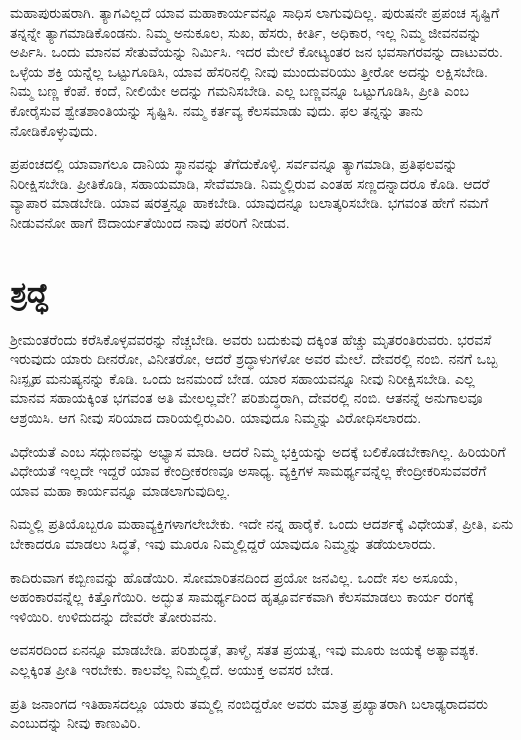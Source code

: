 ಮಹಾಪುರುಷರಾಗಿ. ತ್ಯಾಗವಿಲ್ಲದೆ ಯಾವ ಮಹಾಕಾರ್ಯವನ್ನೂ ಸಾಧಿಸ ಲಾಗುವುದಿಲ್ಲ. ಪುರುಷನೇ ಪ್ರಪಂಚ ಸೃಷ್ಟಿಗೆ ತನ್ನನ್ನೇ ತ್ಯಾಗಮಾಡಿಕೊಂಡನು. ನಿಮ್ಮ ಅನುಕೂಲ, ಸುಖ, ಹೆಸರು, ಕೀರ್ತಿ, ಅಧಿಕಾರ, ಇಲ್ಲ ನಿಮ್ಮ ಜೀವನವನ್ನು ಅರ್ಪಿಸಿ. ಒಂದು ಮಾನವ ಸೇತುವೆಯನ್ನು ನಿರ್ಮಿಸಿ. ಇದರ ಮೇಲೆ ಕೋಟ್ಯಂತರ ಜನ ಭವಸಾಗರವನ್ನು ದಾಟುವರು. ಒಳ್ಳೆಯ ಶಕ್ತಿ ಯನ್ನೆಲ್ಲ ಒಟ್ಟುಗೂಡಿಸಿ, ಯಾವ ಹೆಸರಿನಲ್ಲಿ ನೀವು ಮುಂದುವರಿಯು ತ್ತೀರೋ ಅದನ್ನು ಲಕ್ಷಿಸಬೇಡಿ. ನಿಮ್ಮ ಬಣ್ಣ ಕೆಂಪೆ. ಕಂದೆ, ನೀಲಿಯೇ ಅದನ್ನು ಗಮನಿಸಬೇಡಿ. ಎಲ್ಲ ಬಣ್ಣವನ್ನೂ ಒಟ್ಟುಗೂಡಿಸಿ, ಪ್ರೀತಿ ಎಂಬ ಕೋರೈಸುವ ಶ್ವೇತಶಾಂತಿಯನ್ನು ಸೃಷ್ಟಿಸಿ. ನಮ್ಮ ಕರ್ತವ್ಯ ಕೆಲಸಮಾಡು ವುದು. ಫಲ ತನ್ನನ್ನು ತಾನು ನೋಡಿಕೊಳ್ಳುವುದು.

ಪ್ರಪಂಚದಲ್ಲಿ ಯಾವಾಗಲೂ ದಾನಿಯ ಸ್ಥಾನವನ್ನು ತೆಗೆದುಕೊಳ್ಳಿ. ಸರ್ವವನ್ನೂ ತ್ಯಾಗಮಾಡಿ, ಪ್ರತಿಫಲವನ್ನು ನಿರೀಕ್ಷಿಸಬೇಡಿ. ಪ್ರೀತಿಕೊಡಿ, ಸಹಾಯಮಾಡಿ, ಸೇವೆಮಾಡಿ. ನಿಮ್ಮಲ್ಲಿರುವ ಎಂತಹ ಸಣ್ಣದನ್ನಾದರೂ ಕೊಡಿ. ಆದರೆ ವ್ಯಾಪಾರ ಮಾಡಬೇಡಿ. ಯಾವ ಷರತ್ತನ್ನೂ ಹಾಕಬೇಡಿ. ಯಾವುದನ್ನೂ ಬಲಾತ್ಕರಿಸಬೇಡಿ. ಭಗವಂತ ಹೇಗೆ ನಮಗೆ ನೀಡುವನೋ ಹಾಗೆ ಔದಾರ್ಯತೆಯಿಂದ ನಾವು ಪರರಿಗೆ ನೀಡುವ.


\section{ಶ್ರದ್ಧೆ}

ಶ್ರೀಮಂತರೆಂದು ಕರೆಸಿಕೊಳ್ಳವವರನ್ನು ನೆಚ್ಚಬೇಡಿ. ಅವರು ಬದುಕುವು ದಕ್ಕಿಂತ ಹೆಚ್ಚು ಮೃತರಂತಿರುವರು. ಭರವಸೆ ಇರುವುದು ಯಾರು ದೀನರೋ, ವಿನೀತರೋ, ಆದರೆ ಶ್ರದ್ಧಾಳುಗಳೋ ಅವರ ಮೇಲೆ. ದೇವರಲ್ಲಿ ನಂಬಿ. ನನಗೆ ಒಬ್ಬ ನಿಃಸ್ಪೃಹ ಮನುಷ್ಯನನ್ನು ಕೊಡಿ. ಒಂದು ಜನಮಂದೆ ಬೇಡ. ಯಾರ ಸಹಾಯವನ್ನೂ ನೀವು ನಿರೀಕ್ಷಿಸಬೇಡಿ. ಎಲ್ಲ ಮಾನವ ಸಹಾಯಕ್ಕಿಂತ ಭಗವಂತ ಅತಿ ಮೇಲಲ್ಲವೇ? ಪರಿಶುದ್ಧರಾಗಿ, ದೇವರಲ್ಲಿ ನಂಬಿ. ಆತನನ್ನೆ ಅನುಗಾಲವೂ ಆಶ್ರಯಿಸಿ. ಆಗ ನೀವು ಸರಿಯಾದ ದಾರಿಯಲ್ಲಿರುವಿರಿ. ಯಾವುದೂ ನಿಮ್ಮನ್ನು ವಿರೋಧಿಸಲಾರದು.

ವಿಧೇಯತೆ ಎಂಬ ಸದ್ಗುಣವನ್ನು ಅಭ್ಯಾಸ ಮಾಡಿ. ಆದರೆ ನಿಮ್ಮ ಭಕ್ತಿಯನ್ನು ಅದಕ್ಕೆ ಬಲಿಕೊಡಬೇಕಾಗಿಲ್ಲ. ಹಿರಿಯರಿಗೆ ವಿಧೇಯತೆ ಇಲ್ಲದೇ ಇದ್ದರೆ ಯಾವ ಕೇಂದ್ರೀಕರಣವೂ ಅಸಾಧ್ಯ. ವ್ಯಕ್ತಿಗಳ ಸಾಮರ್ಥ್ಯವನ್ನೆಲ್ಲ ಕೇಂದ್ರೀಕರಿಸುವವರೆಗೆ ಯಾವ ಮಹಾ ಕಾರ್ಯವನ್ನೂ ಮಾಡಲಾಗುವುದಿಲ್ಲ.

ನಿಮ್ಮಲ್ಲಿ ಪ್ರತಿಯೊಬ್ಬರೂ ಮಹಾವ್ಯಕ್ತಿಗಳಾಗಲೇಬೇಕು. ಇದೇ ನನ್ನ ಹಾರೈಕೆ. ಒಂದು ಆದರ್ಶಕ್ಕೆ ವಿಧೇಯತೆ, ಪ್ರೀತಿ, ಏನು ಬೇಕಾದರೂ ಮಾಡಲು ಸಿದ್ಧತೆ, ಇವು ಮೂರೂ ನಿಮ್ಮಲ್ಲಿದ್ದರೆ ಯಾವುದೂ ನಿಮ್ಮನ್ನು ತಡೆಯಲಾರದು.

ಕಾದಿರುವಾಗ ಕಬ್ಬಿಣವನ್ನು ಹೊಡೆಯಿರಿ. ಸೋಮಾರಿತನದಿಂದ ಪ್ರಯೋ ಜನವಿಲ್ಲ. ಒಂದೇ ಸಲ ಅಸೂಯೆ, ಅಹಂಕಾರವನ್ನೆಲ್ಲ ಕಿತ್ತೊಗೆಯಿರಿ. ಅದ್ಭುತ ಸಾಮರ್ಥ್ಯದಿಂದ ಹೃತ್ಪೂರ್ವಕವಾಗಿ ಕೆಲಸಮಾಡಲು ಕಾರ್ಯ ರಂಗಕ್ಕೆ ಇಳಿಯಿರಿ. ಉಳಿದುದನ್ನು ದೇವರೇ ತೋರುವನು.

ಅವಸರದಿಂದ ಏನನ್ನೂ ಮಾಡಬೇಡಿ. ಪರಿಶುದ್ಧತೆ, ತಾಳ್ಮೆ, ಸತತ ಪ್ರಯತ್ನ, ಇವು ಮೂರು ಜಯಕ್ಕೆ ಅತ್ಯಾವಶ್ಯಕ. ಎಲ್ಲಕ್ಕಿಂತ ಪ್ರೀತಿ ಇರಬೇಕು. ಕಾಲವೆಲ್ಲ ನಿಮ್ಮಲ್ಲಿದೆ. ಅಯುಕ್ತ ಅವಸರ ಬೇಡ. 

ಪ್ರತಿ ಜನಾಂಗದ ಇತಿಹಾಸದಲ್ಲೂ ಯಾರು ತಮ್ಮಲ್ಲಿ ನಂಬಿದ್ದರೋ ಅವರು ಮಾತ್ರ ಪ್ರಖ್ಯಾತರಾಗಿ ಬಲಾಢ್ಯರಾದವರು ಎಂಬುದನ್ನು ನೀವು ಕಾಣುವಿರಿ.


